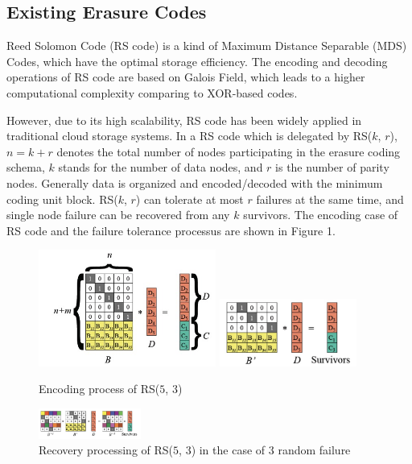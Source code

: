 \documentclass[sigconf]{acmart}
\begin{document}
\subsection{Existing Erasure Codes}

Reed Solomon Code (RS code) is a kind of Maximum Distance Separable (MDS) Codes, which have the optimal storage efficiency. The encoding and decoding operations of RS code are based on Galois Field, which leads to a higher computational complexity comparing to XOR-based codes.

However, due to its high scalability, RS code has been widely applied in traditional cloud storage systems. In a RS code which is delegated by RS($k$, $r$), $n = k + r$ denotes the total number
of nodes participating in the erasure coding schema, $k$ stands for the number of data nodes, and $r$ is the number of parity nodes. Generally data is organized and encoded/decoded with the minimum coding unit block. RS($k$, $r$) can tolerate at most $r$ failures at the same time, and single node failure can be recovered from any $k$ survivors. The encoding case of RS code and the failure tolerance processus are shown in Figure 1.


\begin{figure}[ht]
\centering
\begin{minipage}[b]{0.3\textwidth}
\includegraphics[width=0.52\textwidth]{photo/RS1.jpg}
\includegraphics[width=0.4\textwidth]{photo/RS2.jpg}
\end{minipage}
\caption{Encoding process of RS($5$, $3$)}
\end{figure}

\begin{figure}[H]
\centering
\includegraphics[width=0.3\textwidth]{photo/RS3.jpg}
\caption{Recovery processing of RS($5$, $3$) in the case of 3 random failure}
\end{figure}
\end{document}
